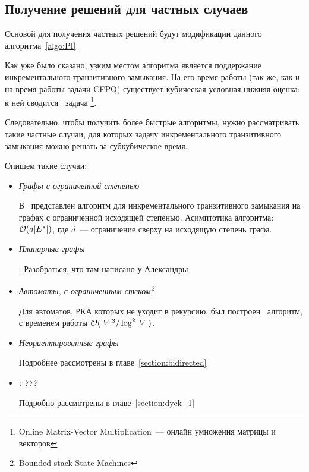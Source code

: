 \subsection{Получение решений для частных случаев}

Основой для получения частных решений будут модификации данного алгоритма~\ref{algo:PI}.

Как уже было сказано, узким местом алгоритма является поддержание инкрементального транзитивного замыкания. На его время работы (так же, как и на время работы задачи CFPQ) существует кубическая условная нижняя оценка: к ней сводится~\cite{Henzinger15} задача \footnote{Online Matrix-Vector Multiplication~--- онлайн умножения матрицы и векторов}. 

Следовательно, чтобы получить более быстрые алгоритмы, нужно рассматривать такие частные случаи, для которых задачу инкрементального транзитивного замыкания можно решать за субкубическое время.

Опишем такие случаи:

\begin{itemize}
  \item \textit{Графы с ограниченной степенью}

    В~\cite{Yellin1993} представлен алгоритм для инкрементального транзитивного замыкания на графах с ограниченной исходящей степенью. Асимптотика алгоритма: $\mathcal{O}(d |E^{*}|)$, где $d$~--- ограничение сверху на исходящую степень графа.

  \item \textit{Планарные графы}

    \TODO: Разобраться, что там написано у Александры 
  
  \item \textit{Автоматы, с ограниченным стеком\footnote{Bounded-stack State Machines}~\cite{Chaudhuri08}}

    Для автоматов, РКА которых не уходит в рекурсию, был построен~\cite{Chaudhuri08} алгоритм, с временем работы $\mathcal{O}(|V|^3 / \log^2 |V|)$.

  \item \textit{Неориентированные графы}

    Подробнее рассмотрены в главе~\ref{section:bidirected}

  \item \textit{\TODO: ???}
    
    Подробно рассмотрены в главе~\ref{section:dyck_1}

\end{itemize}

